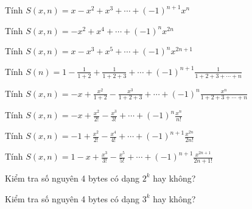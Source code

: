 \begin{problem}
    Tính $S(x, n) = 𝑥 − 𝑥^2 + 𝑥^3 + \cdots + (−1)^{n+1}𝑥^𝑛$
\end{problem}

\begin{problem}
    Tính $S(x, n) = −𝑥^2 + 𝑥^4 + \cdots + (−1)^n𝑥^{2𝑛}$
\end{problem}

\begin{problem}
    Tính $S(x, n) = 𝑥 − 𝑥^3 + 𝑥^5 + \cdots + (−1)^n𝑥^{2𝑛+1}$
\end{problem}

\begin{problem}
    Tính $S(n) = 1 - \frac{1}{1+2} + \frac{1}{1+2+3} + \cdots + (-1)^{n+1} \frac{1}{1+2+3+\cdots+n}$
\end{problem}

\begin{problem}
    Tính $S(x, n) = - x + \frac{x^2}{1+2} - \frac{x^3}{1+2+3} + \cdots + (-1)^{n} \frac{x^n}{1+2+3+\cdots+n}$
\end{problem}

\begin{problem}
    Tính $S(x, n) = -x + \frac{x^2}{2!} - \frac{x^3}{3!} + \cdots + (-1)^{n} \frac{x^n}{n!}$
\end{problem}

\begin{problem}
    Tính $S(x, n) = -1 + \frac{x^2}{2!} - \frac{x^4}{4!} + \cdots + (-1)^{n+1} \frac{x^{2n}}{2n!}$
\end{problem}

\begin{problem}
    Tính $S(x, n) = 1 - x + \frac{x^3}{3!} - \frac{x^5}{5!} + \cdots + (-1)^{n+1} \frac{x^{2n+1}}{{2n+1}!}$
\end{problem}

\begin{problem}
    Kiểm tra số nguyên 4 bytes có dạng $2^𝑘$ hay không?
\end{problem}

\begin{problem}
    Kiểm tra số nguyên 4 bytes có dạng $3^𝑘$ hay không?
\end{problem}


